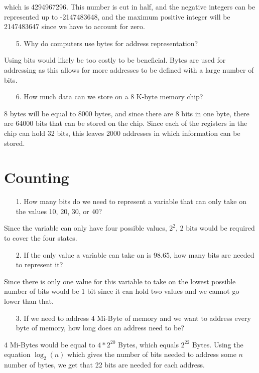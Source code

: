 \documentclass[12pt]{article}
\begin{document}
    which is 4294967296. This number is cut in half, and the negative integers
    can be represented up to -2147483648, and the maximum positive integer will
    be 2147483647 since we have to account for zero.
    \begin{itemize}
        \item[5.] Why do computers use bytes for address representation?
    \end{itemize}
    \par Using bits would likely be too costly to be beneficial. Bytes are used
    for addressing as this allows for more addresses to be defined with a large
    number of bits.
    \begin{itemize}
        \item[6.] How much data can we store on a 8 K-byte memory chip?
    \end{itemize}
    \par 8 bytes will be equal to 8000 bytes, and since there are 8 bits in one
    byte, there are 64000 bits that can be stored on the chip. Since each of the
    registers in the chip can hold 32 bits, this leaves 2000 addresses in which
    information can be stored.
    \section{Counting}
    \begin{itemize}
        \item[1.] How many bits do we need to represent a variable that can only
            take on the values 10, 20, 30, or 40?
    \end{itemize}
    \par Since the variable can only have four possible values, $2^{2}$, 2 bits
    would be required to cover the four states.
    \begin{itemize}
        \item[2.] If the only value a variable can take on is 98.65, how many
            bits are needed to represent it?
    \end{itemize}
    \par Since there is only one value for this variable to take on the lowest
    possible number of bits would be 1 bit since it can hold two values and we
    cannot go lower than that.
    \begin{itemize}
        \item[3.] If we need to address 4 Mi-Byte of memory and we want to
            address every byte of memory, how long does an address need to be?
    \end{itemize}
    \par 4 Mi-Bytes would be equal to $4 * 2^{20}$ Bytes, which equals $2^{22}$
    Bytes. Using the equation $\log_2(n)$ which gives the number of bits needed
    to address some $n$ number of bytes, we get that 22 bits are needed for each
    address.
\end{document}
